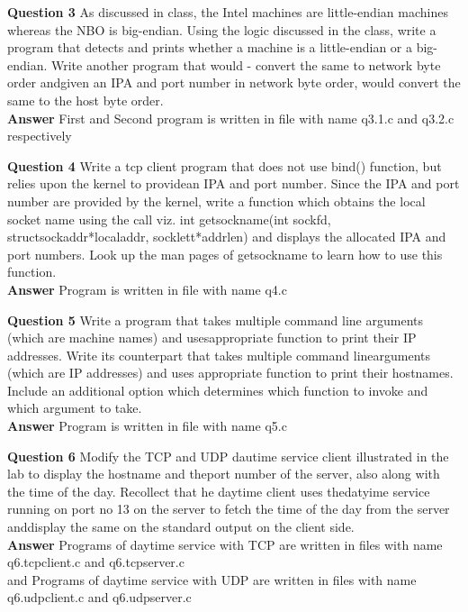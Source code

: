 \documentclass[14pt]{extarticle}
\begin{document}
    \noindent
    \textbf{\large Question 3}
    As discussed in class, the Intel machines are little-endian machines whereas 
    the NBO is big-endian.  Using the logic discussed in the class, 
    write a program that detects and prints whether a machine is a little-endian or a big-endian. 
    Write another program that would - convert the same to network byte order andgiven an IPA 
    and port number in network byte order, 
    would convert the same to the host byte order.\\[10pt]
    \textbf{\large Answer}
    First and Second program is written in file with name q3.1.c and q3.2.c respectively\\
    \vspace{1cm}

    \noindent
    \textbf{\large Question 4}
    Write a tcp client program that does not use bind() function,
     but relies upon the kernel to providean IPA and port number. 
     Since the IPA and port number are provided by the kernel, 
     write a function which obtains the local socket name using the call viz. 
     int getsockname(int sockfd, structsockaddr*localaddr, socklett*addrlen) and 
     displays the allocated IPA and port numbers. 
    Look up the man pages of getsockname to learn how to use this function.\\[10pt]
    \textbf{\large Answer}
    Program is written in file with name q4.c
    \vspace{1cm}

    \noindent
    \textbf{\large Question 5}
    Write a program that takes multiple command line arguments 
    (which  are  machine  names)  and  usesappropriate function to print their IP addresses. 
    Write its counterpart that takes multiple command linearguments (which are IP addresses) and uses appropriate function to print their hostnames. 
    Include an additional option which determines which function to invoke and which argument to take.\\[10pt]
    \textbf{\large Answer}
    Program is written in file with name q5.c
    \vspace{1cm}

    \noindent
    \textbf{\large Question 6}
    Modify the TCP and UDP dautime service client illustrated in the lab to display the hostname and theport number of the server, 
    also along with the time of the day. Recollect that he daytime client uses thedatyime service running on port no 13 on the server to fetch the time of the day from the server anddisplay the same on the standard output on the client side.\\[10pt]
    \textbf{\large Answer}
    Programs of daytime service with TCP are written in files with name q6.tcpclient.c and q6.tcpserver.c\\
    and Programs of daytime service with UDP are written in files with name q6.udpclient.c and q6.udpserver.c
    \vspace{1cm}
\end{document}
